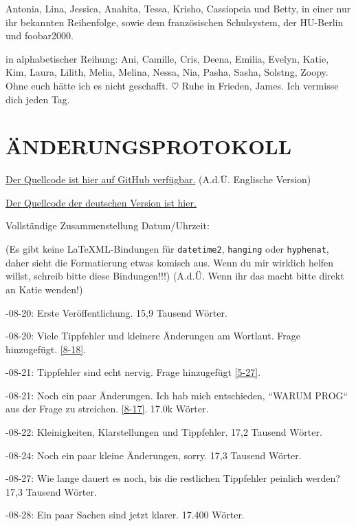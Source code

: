\documentclass{article}
\begin{document}
 Antonia, Lina, Jessica, Anahita, Tessa, Krisho, Cassiopeia und Betty, in einer nur ihr bekannten Reihenfolge, sowie dem französischen Schulsystem, der HU-Berlin und foobar2000.

in alphabetischer Reihung: Ani, Camille, Cris, Deena, Emilia, Evelyn, Katie, Kim, Laura, Lilith, Melia, Melina, Nessa, Nia, Pasha, Sasha, Solstng, Zoopy. Ohne euch hätte ich es nicht geschafft. $\heartsuit$  Ruhe in Frieden, James. Ich vermisse dich jeden Tag.

\section*{ÄNDERUNGSPROTOKOLL}

\noindent \href{https://github.com/Juicysteak117/pghrt/}{Der Quellcode ist hier auf GitHub verfügbar.} (A.d.Ü. Englische Version)

\noindent \href{https://github.com/synthie-cat/pghrt-de}{Der Quellcode der deutschen Version ist hier.}

\noindent Vollständige Zusammenstellung Datum/Uhrzeit: \DTMnow

\noindent(Es gibt keine LaTeXML-Bindungen für \texttt{datetime2}, \texttt{hanging} oder \texttt{hyphenat}, daher sieht die Formatierung etwas komisch aus. Wenn du mir wirklich helfen willst, schreib bitte diese Bindungen!!!) (A.d.Ü. Wenn ihr das macht bitte direkt an Katie wenden!)

-08-20: Erste Veröffentlichung. 15,9 Tausend Wörter.

-08-20: Viele Tippfehler und kleinere Änderungen am Wortlaut. Frage hinzugefügt. \ref{8-18}.

-08-21: Tippfehler sind echt nervig. Frage hinzugefügt \ref{5-27}.

-08-21: Noch ein paar Änderungen. Ich hab mich entschieden, “WARUM PROG“ aus der Frage zu streichen. \ref{8-17}. 17.0k Wörter.

-08-22: Kleinigkeiten, Klarstellungen und Tippfehler. 17,2 Tausend Wörter.

-08-24: Noch ein paar kleine Änderungen, sorry. 17,3 Tausend Wörter.

-08-27: Wie lange dauert es noch, bis die restlichen Tippfehler peinlich werden? 17,3 Tausend Wörter.

-08-28: Ein paar Sachen sind jetzt klarer. 17.400 Wörter.
\end{document}
